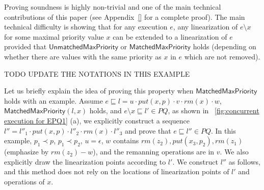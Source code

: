 Proving soundness is highly non-trivial and one of the main technical contributions of this paper (see Appendix~\ref{} for a complete proof). The main technical difficulty is showing that for any execution $e$, any linearization of $e\setminus x$ for some maximal priority value $x$ can be extended to a linearization of $e$ provided that $\mathsf{UnmatchedMaxPriority}$ or $\mathsf{MatchedMaxPriority}$ holds (depending on whether there are values with the same priority as $x$ in $e$ which are not removed).
%
%
%
%
%
%

TODO UPDATE THE NOTATIONS IN THIS EXAMPLE

Let us briefly explain the idea of proving this property when $\mathsf{MatchedMaxPriority}$ holds with an example. Assume $e \sqsubseteq l=u \cdot \textit{put}(x,p) \cdot v \cdot \textit{rm}(x) \cdot w$, $\mathsf{MatchedMaxPriority}(l,x)$ holds, and $e \setminus x \sqsubseteq l' \in \textit{PQ}$, as shown in \figurename~\ref{fig:concurrent execution for EPQ1} (a), we explicitly construct a sequence $l''= l''_1 \cdot \textit{put}(x,p) \cdot l''_2 \cdot \textit{rm}(x) \cdot l''_3$ and prove that $e \sqsubseteq l'' \in \textit{PQ}$. In this example, $p_1 \prec p$, $p_1 \prec p_2$, $u=\epsilon$, $w$ contains $\textit{rm}(z_2), \textit{put}(x_3,p_2), \textit{rm}(z_1)$ (emphasize by $\textit{rm}(z_2)-w$), and the remanning operations are in $v$. We also explicitly draw the linearization points according to $l'$. We construct $l''$ as follows, and this method does not rely on the locations of linearization points of $l'$ and operations of $x$.

